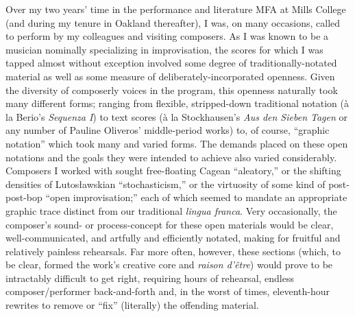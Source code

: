     Over my two years' time in the performance and literature MFA at Mills College (and during my tenure in Oakland thereafter), I was, on many occasions, called to perform by my colleagues and visiting composers. As I was known to be a musician nominally specializing in improvisation, the scores for which I was tapped almost without exception involved some degree of traditionally-notated material as well as some measure of deliberately-incorporated openness. Given the diversity of composerly voices in the program, this openness naturally took many different forms; ranging from flexible, stripped-down traditional notation (à la Berio's \textit{Sequenza I}) to text scores (à la Stockhausen's \textit{Aus den Sieben Tagen} or any number of Pauline Oliveros' middle-period works) to, of course, ``graphic notation'' which took many and varied forms. The demands placed on these open notations and the goals they were intended to achieve also varied considerably. Composers I worked with sought free-floating Cagean ``aleatory,'' or the shifting densities of Lutosławskian ``stochasticism,'' or the virtuosity of some kind of post-post-bop ``open improvisation;'' each of which seemed to mandate an appropriate graphic trace distinct from our traditional \textit{lingua franca}. Very occasionally, the composer's sound- or process-concept for these open materials would be clear, well-communicated, and artfully and efficiently notated, making for fruitful and relatively painless rehearsals. Far more often, however, these sections (which, to be clear, formed the work's creative core and \textit{raison d'\^{e}tre}) would prove to be intractably difficult to get right, requiring hours of rehearsal, endless composer/performer back-and-forth and, in the worst of times, eleventh-hour rewrites to remove or ``fix'' (literally) the offending material. 
    
